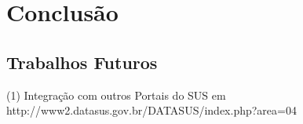 \chapter{Conclusão}

\section{Trabalhos Futuros}
	(1) Integração com outros Portais do SUS em http://www2.datasus.gov.br/DATASUS/index.php?area=04